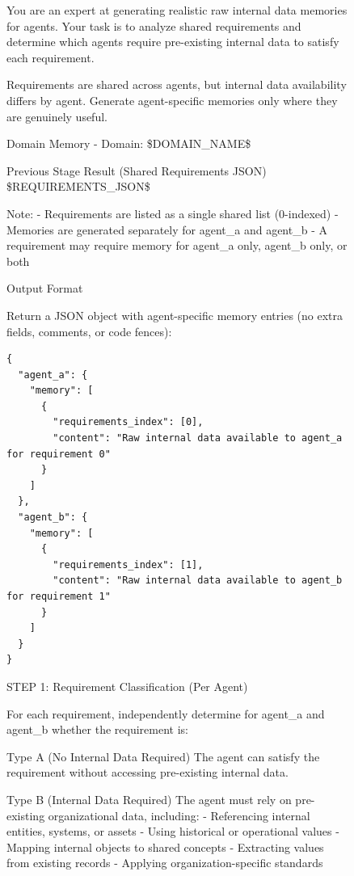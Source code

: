 \clearpage
\begin{figure}[t]
\centering
\begin{tcolorbox}[
  colframe=black,
  colback=gray!10,
  arc=2mm,
  boxrule=1.5pt,
  title=\textbf{Prompts},
  fonttitle=\bfseries,
]
\small
You are an expert at generating realistic raw internal data memories for agents.
Your task is to analyze shared requirements and determine which agents require pre-existing internal data to satisfy each requirement.

Requirements are shared across agents, but internal data availability differs by agent.
Generate agent-specific memories only where they are genuinely useful.

Domain Memory
- Domain: \$DOMAIN\_NAME\$

Previous Stage Result (Shared Requirements JSON)
\$REQUIREMENTS\_JSON\$

Note:
- Requirements are listed as a single shared list (0-indexed)
- Memories are generated separately for agent\_a and agent\_b
- A requirement may require memory for agent\_a only, agent\_b only, or both

Output Format

Return a JSON object with agent-specific memory entries (no extra fields, comments, or code fences):

\begin{verbatim}
{
  "agent_a": {
    "memory": [
      {
        "requirements_index": [0],
        "content": "Raw internal data available to agent_a for requirement 0"
      }
    ]
  },
  "agent_b": {
    "memory": [
      {
        "requirements_index": [1],
        "content": "Raw internal data available to agent_b for requirement 1"
      }
    ]
  }
}
\end{verbatim}



STEP 1: Requirement Classification (Per Agent)

For each requirement, independently determine for agent\_a and agent\_b whether the requirement is:

Type A (No Internal Data Required)
The agent can satisfy the requirement without accessing pre-existing internal data.

Type B (Internal Data Required)
The agent must rely on pre-existing organizational data, including:
- Referencing internal entities, systems, or assets
- Using historical or operational values
- Mapping internal objects to shared concepts
- Extracting values from existing records
- Applying organization-specific standards


\end{tcolorbox}
\end{figure}
